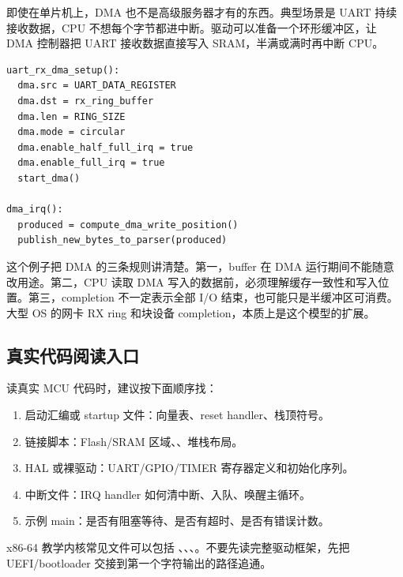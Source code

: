 即使在单片机上，DMA 也不是高级服务器才有的东西。典型场景是 UART 持续接收数据，CPU 不想每个字节都进中断。驱动可以准备一个环形缓冲区，让 DMA 控制器把 UART 接收数据直接写入 SRAM，半满或满时再中断 CPU。

\begin{lstlisting}
uart_rx_dma_setup():
  dma.src = UART_DATA_REGISTER
  dma.dst = rx_ring_buffer
  dma.len = RING_SIZE
  dma.mode = circular
  dma.enable_half_full_irq = true
  dma.enable_full_irq = true
  start_dma()

dma_irq():
  produced = compute_dma_write_position()
  publish_new_bytes_to_parser(produced)
\end{lstlisting}

这个例子把 DMA 的三条规则讲清楚。第一，buffer 在 DMA 运行期间不能随意改用途。第二，CPU 读取 DMA 写入的数据前，必须理解缓存一致性和写入位置。第三，completion 不一定表示全部 I/O 结束，也可能只是半缓冲区可消费。大型 OS 的网卡 RX ring 和块设备 completion，本质上是这个模型的扩展。

\subsection{真实代码阅读入口}

读真实 MCU 代码时，建议按下面顺序找：

\begin{enumerate}
\tightlist
\item 启动汇编或 startup 文件：向量表、reset handler、栈顶符号。
\item 链接脚本：Flash/SRAM 区域、、堆栈布局。
\item HAL 或裸驱动：UART/GPIO/TIMER 寄存器定义和初始化序列。
\item 中断文件：IRQ handler 如何清中断、入队、唤醒主循环。
\item 示例 main：是否有阻塞等待、是否有超时、是否有错误计数。
\end{enumerate}

x86-64 教学内核常见文件可以包括 、、、。不要先读完整驱动框架，先把 UEFI/bootloader 交接到第一个字符输出的路径追通。
